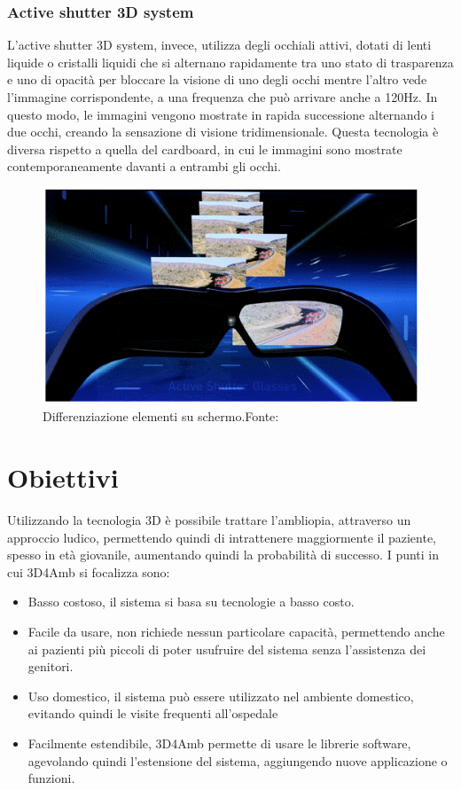 \documentclass[
a4paper,
cleardoublepage=empty,
headings=twolinechapter,
numbers=autoenddot,
]{scrbook}
\begin{document}
	\subsubsection{Active shutter 3D system}
	   L'active shutter 3D system, invece, utilizza degli occhiali attivi, dotati di lenti liquide o cristalli liquidi che si alternano rapidamente tra uno stato di trasparenza e uno di opacità per bloccare la visione di uno degli occhi mentre l'altro vede l'immagine corrispondente, a una frequenza che può arrivare anche a 120Hz. In questo modo, le immagini vengono mostrate in rapida successione alternando i due occhi, creando la sensazione di visione tridimensionale. Questa tecnologia è diversa rispetto a quella del cardboard, in cui le immagini sono mostrate contemporaneamente davanti a entrambi gli occhi.
		\begin{figure}[H]
		\centering
		\includegraphics[width=0.6\linewidth]{image/active-shutter-3d-technology}
		\caption{Differenziazione elementi su schermo.Fonte:\cite{active-shutter-3d_image}}
		\label{fig:occhiali active-shutter-3d-technology}
	\end{figure}

	\section{Obiettivi}
	Utilizzando la tecnologia 3D è possibile trattare l'ambliopia, attraverso un approccio ludico, permettendo quindi di intrattenere maggiormente il paziente, spesso in età giovanile, aumentando quindi la probabilità di successo.
	I punti in cui 3D4Amb si focalizza sono:
	\begin{itemize}
		\item Basso costoso, il sistema si basa su tecnologie a basso costo.
		\item Facile da usare, non richiede nessun particolare capacità, permettendo anche ai pazienti più piccoli di poter usufruire del sistema senza l'assistenza dei genitori.
		\item Uso domestico, il sistema può essere utilizzato nel ambiente domestico, evitando quindi le visite frequenti all'ospedale
		\item Facilmente estendibile, 3D4Amb permette di usare le librerie software, agevolando  quindi l'estensione del sistema, aggiungendo nuove applicazione o funzioni.
	\end{itemize}
\end{document}
